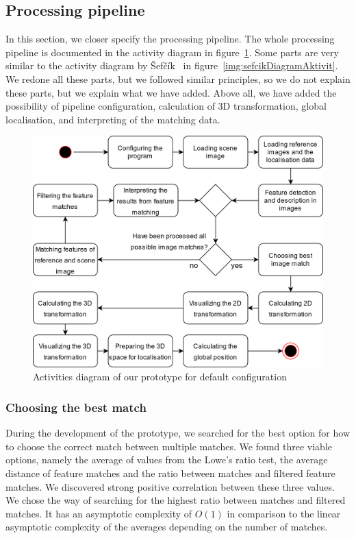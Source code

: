 \documentclass[thesis=B,english]{FITthesis}[2019/12/23]
\begin{document}
        \subsection{Processing pipeline}
            In this section, we closer specify the processing pipeline. The whole processing pipeline is documented in the activity diagram in figure~\ref{fig:Activitiesdiagram}. Some parts are very similar to the activity diagram by Šefčík~\cite{Sefcik2020} in figure~\ref{img:sefcikDiagramAktivit}. We redone all these parts, but we followed similar principles, so we do not explain these parts, but we explain what we have added. Above all, we have added the possibility of pipeline configuration, calculation of 3D transformation, global localisation, and interpreting of the matching data.
            
            \begin{figure}
                \centering
                \includegraphics[width = 0.9\linewidth] {pictures/realisation/ourActivitiesDiagram.png}
                \caption{Activities diagram of our prototype for default configuration}
                \label{fig:Activitiesdiagram}
            \end{figure}
            
            \subsubsection*{Choosing the best match}
                During the development of the prototype, we searched for the best option for how to choose the correct match between multiple matches. We found three viable options, namely the average of values from the Lowe's ratio test, the average distance of feature matches and the ratio between matches and filtered feature matches. We discovered strong positive correlation between these three values. We chose the way of searching for the highest ratio between matches and filtered matches. It has an asymptotic complexity of \(O(1)\) in comparison to the linear asymptotic complexity of the averages depending on the number of matches.
                
\end{document}
